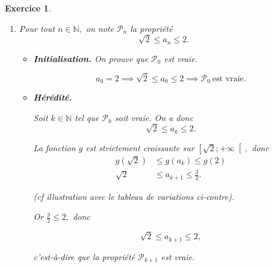\documentclass[10pt]{article}
\newtheorem{exo}{Exercice}
\begin{document}
\begin{exo}
\begin{enumerate}




\item Pour tout $n\in\mathbb{N},$ on note $\mathcal{P}_n$ la propriété \[\sqrt{2}\leq a_n\leq 2.\]

\begin{itemize}
\item[{\textbullet}] \textbf{Initialisation.} On prouve que $\mathcal{P}_0$ est vraie.

\[a_0=2\implies \sqrt{2}\leq a_0\leq 2 \implies\mathcal{P}_0~\text{est vraie}.\]




\item[{\textbullet}] \textbf{Hérédité.}

\setlength{\columnseprule}{1pt}

\begin{multicols}{2}

Soit $k\in\mathbb{N}$ tel que $\mathcal{P}_k$ soit vraie. On a donc
\[\sqrt{2}\leq a_k\leq 2.\]%







La fonction $g$ est strictement croissante sur $\left[\sqrt{2};+\infty\right[,$ donc
\begin{align*}g\left(\sqrt{2}\right)&\leq g\left(a_k\right)\leq g(2)
\\ \sqrt{2}&\leq a_{k+1}\leq \frac{3}{2}.
\end{align*}

(cf illustration avec le tableau de variations ci-contre).

\medskip

Or $\frac{3}{2}\leq 2,$ donc

\[\sqrt{2}\leq a_{k+1}\leq 2,\]

c'est-à-dire que la propriété $\mathcal{P}_{k+1}$ est  vraie.

\columnbreak

\vspace*{1cm}
\begin{center}
\end{center}



\end{multicols}
\end{itemize}
\end{enumerate}
\end{exo}
\end{document}
